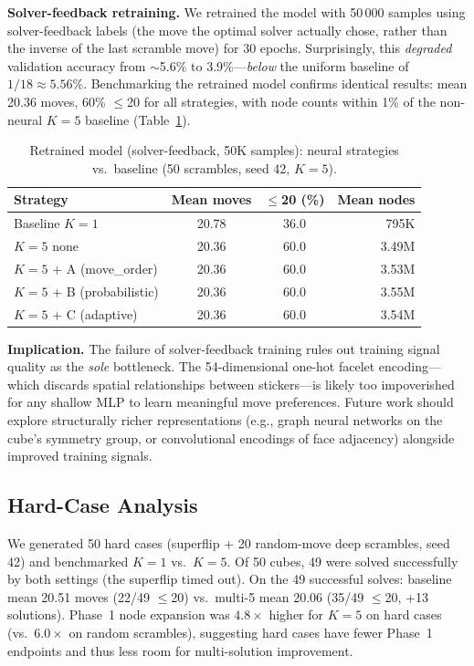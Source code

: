 \documentclass[10pt,twocolumn,a4paper]{article}
\begin{document}
\textbf{Solver-feedback retraining.} We retrained the model with 50\,000 samples using solver-feedback labels (the move the optimal solver actually chose, rather than the inverse of the last scramble move) for 30 epochs. Surprisingly, this \emph{degraded} validation accuracy from $\sim$5.6\% to 3.9\%---\emph{below} the uniform baseline of $1/18 \approx 5.56\%$. Benchmarking the retrained model confirms identical results: mean 20.36 moves, 60\% $\leq$20 for all strategies, with node counts within 1\% of the non-neural $K{=}5$ baseline (Table~\ref{tab:retrained}).

\begin{table}[t]
\centering
\caption{Retrained model (solver-feedback, 50K samples): neural strategies vs.\ baseline (50 scrambles, seed 42, $K{=}5$).}
\label{tab:retrained}
\begin{tabular}{@{}lccr@{}}
\toprule
\textbf{Strategy} & \textbf{Mean moves} & \textbf{$\leq$20 (\%)} & \textbf{Mean nodes} \\
\midrule
Baseline $K{=}1$ & 20.78 & 36.0 & 795K \\
$K{=}5$ none & 20.36 & 60.0 & 3.49M \\
$K{=}5$ + A (move\_order) & 20.36 & 60.0 & 3.53M \\
$K{=}5$ + B (probabilistic) & 20.36 & 60.0 & 3.55M \\
$K{=}5$ + C (adaptive) & 20.36 & 60.0 & 3.54M \\
\bottomrule
\end{tabular}
\end{table}

\textbf{Implication.} The failure of solver-feedback training rules out training signal quality as the \emph{sole} bottleneck. The 54-dimensional one-hot facelet encoding---which discards spatial relationships between stickers---is likely too impoverished for any shallow MLP to learn meaningful move preferences. Future work should explore structurally richer representations (e.g., graph neural networks on the cube's symmetry group, or convolutional encodings of face adjacency) alongside improved training signals.

\subsection{Hard-Case Analysis}
\label{sec:hard-cases}

We generated 50 hard cases (superflip + 20 random-move deep scrambles, seed 42) and benchmarked $K{=}1$ vs.\ $K{=}5$. Of 50 cubes, 49 were solved successfully by both settings (the superflip timed out). On the 49 successful solves: baseline mean 20.51 moves (22/49 $\leq$20) vs.\ multi-5 mean 20.06 (35/49 $\leq$20, +13 solutions). Phase~1 node expansion was $4.8\times$ higher for $K{=}5$ on hard cases (vs.\ $6.0\times$ on random scrambles), suggesting hard cases have fewer Phase~1 endpoints and thus less room for multi-solution improvement.
\end{document}
